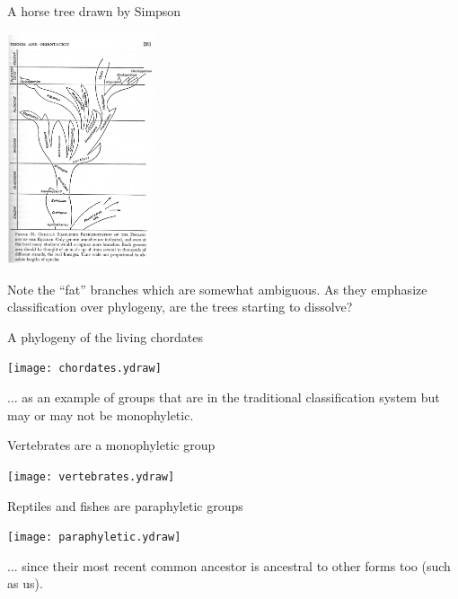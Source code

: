 \documentclass[bluish,slideColor,colorBG,pdf]{prosper}
\begin{document}
\begin{slide}[Replace]{A horse tree drawn by Simpson}
\vspace{-0.1in}

\centerline{\includegraphics[width=1.7in]{horses.ps}}
\medskip

Note the ``fat'' branches which are somewhat ambiguous.  As they emphasize
classification over phylogeny, are the trees starting to
dissolve?

\end{slide}

\begin{slide}[Replace]{A phylogeny of the living chordates}

\centerline{\texttt{[image: chordates.ydraw]}}
\medskip

... as an example of groups that are in the traditional classification system
but may or may not be monophyletic.

\end{slide}

\begin{slide}[Replace]{Vertebrates are a monophyletic group}

\centerline{\texttt{[image: vertebrates.ydraw]}}

\end{slide}

\begin{slide}[Replace]{Reptiles and fishes are paraphyletic groups}

\centerline{\texttt{[image: paraphyletic.ydraw]}}
\medskip

... since their most recent common ancestor is ancestral to other forms too
(such as us).

\end{slide}
\end{document}
